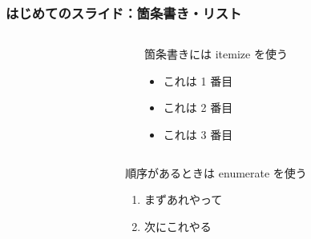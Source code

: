 \begin{frame}[fragile]
  \frametitle{はじめてのスライド：箇条書き・リスト}
  \begin{columns}
    \begin{column}{0.51\textwidth}
      
    \end{column}
    \begin{column}{0.49\textwidth}
      箇条書きには itemize を使う
  
      \begin{itemize}
      \item これは 1 番目
      \item これは 2 番目
      \item これは 3 番目
      \end{itemize}
    \end{column}
  \end{columns}

  \begin{columns}
    \begin{column}{0.51\textwidth}
      
    \end{column}
    \begin{column}{0.49\textwidth}
      順序があるときは enumerate を使う
  
      \begin{enumerate}
      \item まずあれやって
      \item 次にこれやる
      \end{enumerate}
    \end{column}
  \end{columns}

\end{frame}

